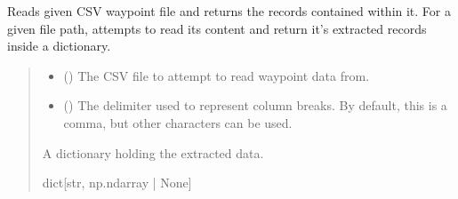 \documentclass[letterpaper,10pt,english]{sphinxmanual}
\begin{document}

\begin{fulllineitems}
\label{\detokenize{modules/waypoints/generation:qnav.waypoints.generation.read_csv_waypoints}}
\pysigstartsignatures
{}
\pysigstopsignatures
\sphinxAtStartPar
Reads given CSV waypoint file and returns the records contained within it.
For a given file path, attempts to read its content and return it’s
extracted records inside a dictionary.
\begin{quote}\begin{description}
\begin{itemize}
\item {} 
\sphinxAtStartPar
{} () \textendash{} The CSV file to attempt to read waypoint data from.

\item {} 
\sphinxAtStartPar
{} () \textendash{} The delimiter used to represent column breaks.
By default, this is a comma, but other characters can be used.

\end{itemize}

\sphinxAtStartPar
A dictionary holding the extracted data.

\sphinxAtStartPar
dict{[}str, np.ndarray | None{]}

\end{description}\end{quote}

\end{fulllineitems}


\sphinxstepscope
\end{document}
